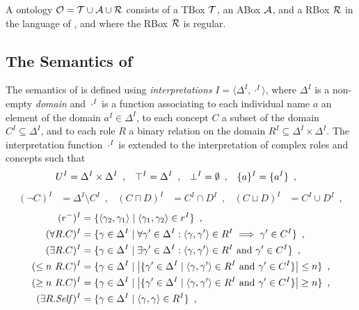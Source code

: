 
\begin{definition}
A \SROIQ  ontology $\mathcal{O} = \mathcal{T} \cup \mathcal{A} \cup \mathcal{R}$ consists of a TBox $\mathcal{T}$, an ABox $\mathcal{A}$, and a RBox $\mathcal{R}$ in the language of \SROIQ, and where the RBox $\mathcal{R}$ is regular.
\end{definition}

\subsection{The Semantics of \SROIQ} \label{sroiq-semantics}

The semantics of \SROIQ is defined using \emph{interpretations} $I = \langle \Delta^I, \cdot^I \rangle$, where $\Delta^I$ is a non-empty \emph{domain} and $\cdot^I$ is a function associating to each individual name $a$ an element of the domain $a^I \in \Delta^I$, to each concept $C$ a subset of the domain $C^I \subseteq \Delta^I$, and to each role $R$ a binary relation on the domain $R^I \subseteq \Delta^I \times \Delta^I$. The interpretation function $\cdot^I$ is extended to the interpretation of complex roles and concepts such that
\begin{align*}
  U^I &= \Delta^I \times \Delta^I \enspace, &
  \top^I &= \Delta^I \enspace, &
  \bot^I &= \emptyset \enspace, &
  \{a\}^I &= \{ a^I \} \enspace,
\end{align*}
\vspace{-9mm}
\begin{align*}
  (\lnot C)^I &= \Delta^I \setminus C^I \enspace, &
  (C \sqcap D)^I &= C^I \cap D^I \enspace, &
  (C \sqcup D)^I &= C^I \cup D^I \enspace,
\end{align*} 
\vspace{-9mm}
\begin{align*}
  (r^-)^I &= \{ \langle \gamma_2, \gamma_1 \rangle \mid \langle \gamma_1, \gamma_2 \rangle \in r^I \} \enspace, \\
  (\forall R.C)^I &= \{ \gamma \in \Delta^I \mid \forall \gamma' \in \Delta^I : \langle \gamma, \gamma' \rangle \in R^I \implies \gamma' \in C^I \} \enspace, \\
  (\exists R.C)^I &= \{ \gamma \in \Delta^I \mid \exists \gamma' \in \Delta^I : \langle \gamma, \gamma' \rangle \in R^I \text{ and } \gamma' \in C^I \} \enspace, \\
  (\leq n~R.C)^I &= \{ \gamma \in \Delta^I \mid \left| \{ \gamma' \in \Delta^I \mid \langle \gamma, \gamma' \rangle \in R^I \text{ and } \gamma' \in C^I \} \right| \leq n \} \enspace, \\
  (\geq n~R.C)^I &= \{ \gamma \in \Delta^I \mid \left| \{ \gamma' \in \Delta^I \mid \langle \gamma, \gamma' \rangle \in R^I \text{ and } \gamma' \in C^I \} \right| \geq n \} \enspace, \\
  (\exists R.\mathit{Self})^I &= \{ \gamma \in \Delta^I \mid \langle \gamma, \gamma \rangle \in R^I \} \enspace,
\end{align*}
